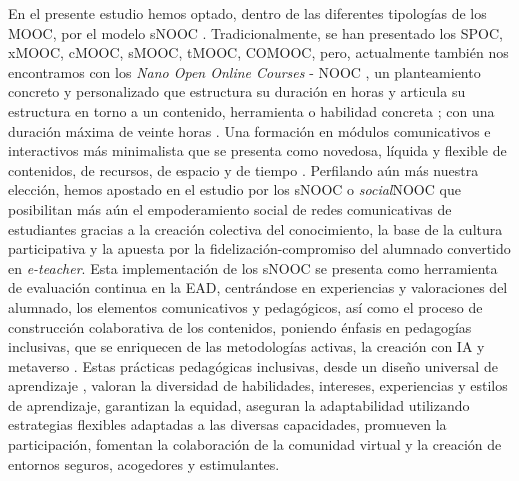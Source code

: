 En el presente estudio hemos optado, dentro de las diferentes tipologías
de los MOOC, por el modelo sNOOC \cite{quintana2024snooc}. Tradicionalmente,
se han presentado los SPOC, xMOOC, cMOOC, sMOOC, tMOOC, COMOOC, pero,
actualmente también nos encontramos con los \emph{Nano Open Online
Courses} - NOOC \cite{clark2013moocs,gomez2016,Osuna-Acedo2017,LopezdelaSerna_Garrido_2018,Escaño_Dewhurst_2024}, un planteamiento
concreto y personalizado que estructura su duración en horas y articula
su estructura en torno a un contenido, herramienta o habilidad concreta
\cite{MANANGÓN-CABRERA2023,huesoromero2024}; con una duración máxima de veinte
horas \cite{intef2016}. Una formación en módulos comunicativos e
interactivos más minimalista que se presenta como novedosa, líquida y
flexible de contenidos, de recursos, de espacio y de tiempo \cite{basantes2020}. Perfilando aún más
nuestra elección, hemos apostado en el estudio por los sNOOC o
\emph{social}NOOC que posibilitan más aún el empoderamiento social de
redes comunicativas de estudiantes gracias a la creación colectiva del
conocimiento, la base de la cultura participativa y la apuesta por la
fidelización-compromiso del alumnado convertido en \emph{e-teacher}.
Esta implementación de los sNOOC se presenta como herramienta de
evaluación continua en la EAD, centrándose en experiencias y
valoraciones del alumnado, los elementos comunicativos y pedagógicos,
así como el proceso de construcción colaborativa de los contenidos,
poniendo énfasis en pedagogías inclusivas, que se enriquecen de las
metodologías activas, la creación con IA y metaverso \cite{galíndez2024}. Estas prácticas pedagógicas inclusivas, desde un diseño universal
de aprendizaje \cite{SanchezFuentes2023}, valoran la diversidad de
habilidades, intereses, experiencias y estilos de aprendizaje,
garantizan la equidad, aseguran la adaptabilidad utilizando estrategias
flexibles adaptadas a las diversas capacidades, promueven la
participación, fomentan la colaboración de la comunidad virtual y la
creación de entornos seguros, acogedores y estimulantes.

